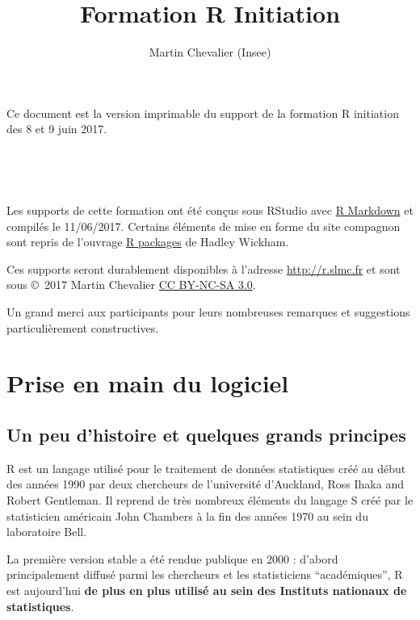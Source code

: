 \documentclass[12pt,twosided, notitlepage]{book}
\title{Formation R Initiation}
\author{Martin Chevalier (Insee)}
\date{}
\makeatletter
\newcommand*{\toccontents}{\@starttoc{toc}}
\newif \ifsol
\makeatother
\begin{document}
\maketitle

\thispagestyle{empty}

Ce document est la version imprimable du support de la formation R
initiation des 8 et 9 juin 2017.

~

\toccontents

~

Les supports de cette formation ont été conçus sous RStudio avec
\href{http://rmarkdown.rstudio.com/}{R Markdown} et compilés le
11/06/2017. Certains éléments de mise en forme du site compagnon sont
repris de l'ouvrage \href{http://r-pkgs.had.co.nz/}{R packages} de
Hadley Wickham.

Ces supports seront durablement disponibles à l'adresse
\url{http://r.slmc.fr} et sont sous \copyright ~2017 Martin Chevalier
\href{https://creativecommons.org/licenses/by-nc-sa/3.0/fr}{CC BY-NC-SA
3.0}.

Un grand merci aux participants pour leurs nombreuses remarques et
suggestions particulièrement constructives.

\renewcommand{\cftsecfont}{\small\bfseries}

\soltrue

\chapter{Prise en main du logiciel}

\minitoc 

\section{Un peu d'histoire et quelques grands
principes}\label{un-peu-dhistoire-et-quelques-grands-principes}

R est un langage utilisé pour le traitement de données statistiques créé
au début des années 1990 par deux chercheurs de l'université d'Auckland,
Ross Ihaka and Robert Gentleman. Il reprend de très nombreux éléments du
langage S créé par le statisticien américain John Chambers à la fin des
années 1970 au sein du laboratoire Bell.

La première version stable a été rendue publique en 2000 : d'abord
principalement diffusé parmi les chercheurs et les statisticiens
\enquote{académiques}, R est aujourd'hui \textbf{de plus en plus utilisé
au sein des Instituts nationaux de statistiques}.
\end{document}

